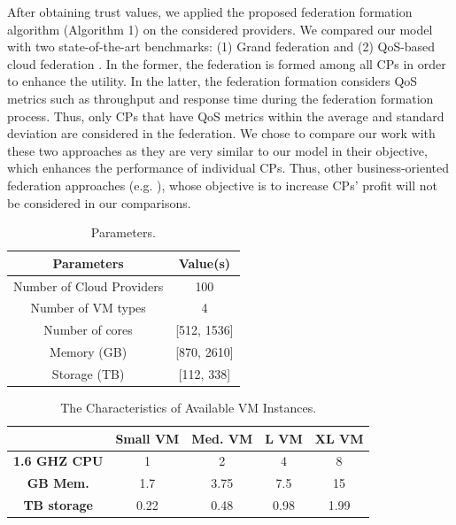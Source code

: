 \documentclass[preprint]{elsarticle}
\theoremstyle{definition}
\theoremstyle{remark}
\theoremstyle{property}
\begin{document}
After obtaining trust values, we applied the proposed federation formation algorithm (Algorithm 1) on the considered providers. We compared our model with two state-of-the-art benchmarks: (1) Grand federation \cite{buyya2010intercloud} and (2) QoS-based cloud federation \cite{salama2014qos}. In the former, the federation is formed among all CPs in order to enhance the utility. In the latter, the federation formation considers QoS metrics such as throughput and response time during the federation formation process. Thus, only CPs that have QoS metrics within the average and standard deviation are considered in the federation. We chose to compare our work with these two approaches as they are very similar to our model in their objective, which enhances the performance of individual CPs. Thus, other business-oriented federation approaches (e.g. \cite{hassan2015qos} \cite{mashayekhy2015cloud} \cite{li2013profit} \cite{yang2012business}), whose objective is to increase CPs' profit will not be considered in our comparisons.


\begin{table}[!ht]
\caption{Parameters.}
\centering
\begin{tabular}{|c c|}
\hline
\textbf{Parameters} & \textbf{Value(s)} \\
\hline
Number of Cloud Providers & 100 \\
Number of VM types & 4 \\
Number of cores & [512, 1536]\\
Memory (GB) & [870, 2610] \\
Storage (TB) & [112, 338] \\
\hline
\end{tabular}
\end{table}

\begin{table}[!ht]
\caption{The Characteristics of Available VM Instances.}
\centering
\begin{tabular}{|c c c c c|}
\hline
& \textbf{Small VM} & \textbf{Med. VM} & \textbf{L VM} & \textbf{XL VM} \\
\hline
\textbf{1.6 GHZ CPU} &1 & 2 & 4 & 8 \\
\textbf{GB Mem.} & 1.7 &3.75 &7.5&15\\
\textbf{TB storage} & 0.22 & 0.48&0.98&1.99 \\
\hline
\end{tabular}
\end{table}
\end{document}
